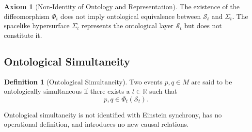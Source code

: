 \documentclass[11pt,a4paper]{article}
\theoremstyle{plain}
\theoremstyle{definition}
\newtheorem{axiom}{Axiom}
\newtheorem{definition}{Definition}
\theoremstyle{remark}
\begin{document}
\begin{axiom}[Non-Identity of Ontology and Representation]
The existence of the diffeomorphism $\Phi_t$ does not imply ontological equivalence between $\mathcal{S}_t$ and $\Sigma_t$. The spacelike hypersurface $\Sigma_t$ represents the ontological layer $\mathcal{S}_t$ but does not constitute it.
\end{axiom}

\subsection{Ontological Simultaneity}

\begin{definition}[Ontological Simultaneity]
Two events $p,q\in M$ are said to be ontologically simultaneous if there exists a $t\in\mathbb{R}$ such that
\[
p,q\in \Phi_t(\mathcal{S}_t).
\]
\end{definition}

Ontological simultaneity is not identified with Einstein synchrony, has no operational definition, and introduces no new causal relations.
\end{document}
